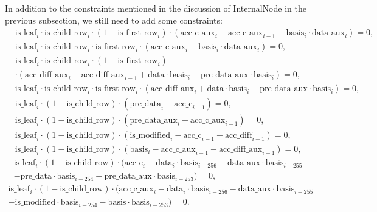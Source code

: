 In addition to the constraints mentioned in the discussion of InternalNode in the previous subsection, we still need to add some constraints:
\begin{align*}
    & \mathrm{is\_leaf}_i \cdot \mathrm{is\_child\_row}_i \cdot (1-\mathrm{is\_first\_row}_i) \cdot (\mathrm{acc\_c\_aux}_i-\mathrm{acc\_c\_aux}_{i-1}-\mathrm{basis}_i \cdot \mathrm{data\_aux}_i)=0, \\
    & \mathrm{is\_leaf}_i \cdot \mathrm{is\_child\_row}_i \cdot \mathrm{is\_first\_row}_i \cdot (\mathrm{acc\_c\_aux}_i-\mathrm{basis}_i \cdot \mathrm{data\_aux}_i)=0,
\end{align*}
\begin{multline*}
    \mathrm{is\_leaf}_i \cdot \mathrm{is\_child\_row}_i \cdot (1-\mathrm{is\_first\_row}_i) \\
    \cdot (\mathrm{acc\_diff\_aux}_i-\mathrm{acc\_diff\_aux}_{i-1} + \mathrm{data} \cdot \mathrm{basis}_i-\mathrm{pre\_data\_aux} \cdot \mathrm{basis}_i)=0,
\end{multline*}
\begin{align*}
    & \mathrm{is\_leaf}_i \cdot \mathrm{is\_child\_row}_i \cdot \mathrm{is\_first\_row}_i \cdot (\mathrm{acc\_diff\_aux}_i+\mathrm{data} \cdot \mathrm{basis}_i-\mathrm{pre\_data\_aux} \cdot \mathrm{basis}_i) = 0, \\
    & \mathrm{is\_leaf}_i \cdot (1-\mathrm{is\_child\_row}) \cdot (\mathrm{pre\_data}_i-\mathrm{acc\_c}_{i-1})=0, \\
    & \mathrm{is\_leaf}_i \cdot (1-\mathrm{is\_child\_row}) \cdot (\mathrm{pre\_data\_aux}_i-\mathrm{acc\_c\_aux}_{i-1})=0, \\
    & \mathrm{is\_leaf}_i \cdot (1-\mathrm{is\_child\_row}) \cdot (\mathrm{is\_modified}_i-\mathrm{acc\_c}_{i-1}-\mathrm{acc\_diff}_{i-1})=0, \\
    & \mathrm{is\_leaf}_i \cdot (1-\mathrm{is\_child\_row}) \cdot (\mathrm{basis}_i-\mathrm{acc\_c\_aux}_{i-1}-\mathrm{acc\_diff\_aux}_{i-1})=0,
\end{align*}
\begin{multline*}
    \mathrm{is\_leaf}_i\cdot (1-\mathrm{is\_child\_row})\cdot (\mathrm{acc\_c}_i - \mathrm{data}_i\cdot \mathrm{basis}_{i-256} - \mathrm{data\_aux}\cdot \mathrm{basis}_{i-255} \\
    - \mathrm{pre\_data}\cdot \mathrm{basis}_{i-254}- \mathrm{pre\_data\_aux}\cdot \mathrm{basis}_{i-253})=0,
\end{multline*}
\begin{multline*}
    \mathrm{is\_leaf}_i \cdot (1-\mathrm{is\_child\_row}) \cdot (\mathrm{acc\_c\_aux}_i - \mathrm{data}_i \cdot \mathrm{basis}_{i-256} - \mathrm{data\_aux} \cdot \mathrm{basis}_{i-255} \\
    - \mathrm{is\_modified} \cdot \mathrm{basis}_{i-254}- \mathrm{basis} \cdot \mathrm{basis}_{i-253})=0.
\end{multline*}

